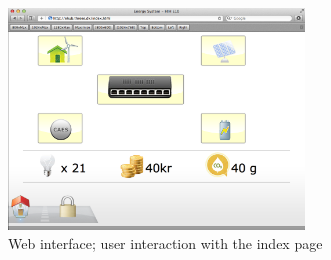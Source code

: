 \begin{figure}[H]
	\begin{centering}
		 \includegraphics[width=0.7\textwidth]{images/screen_index_page.png}
		\caption{Web interface; user interaction with the index page}
 	\end{centering}
\end{figure}
